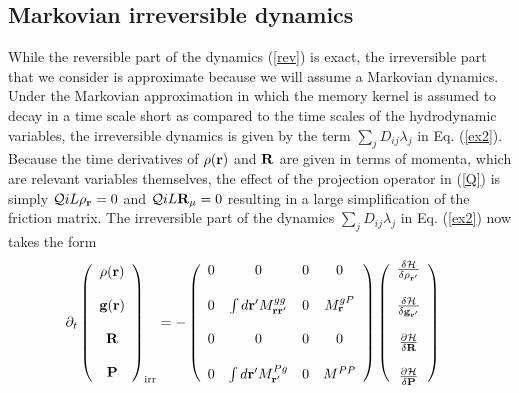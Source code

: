 \documentclass[a4paper,openright,12pt]{book}
\begin{document}
\subsection{Markovian irreversible dynamics}
While the  reversible part of  the dynamics (\ref{rev}) is  exact, the
irreversible  part  that we  consider  is  approximate
because  we will  assume a  Markovian dynamics.   Under the  Markovian
approximation in which the memory kernel is assumed to decay in a time
scale  short  as compared  to  the  time  scales of  the  hydrodynamic
variables,   the  irreversible   dynamics   is  given   by  the   term
$\sum_jD_{ij}\lambda_j$   in  Eq.   (\ref{ex2}).   Because   the  time
derivatives of  $\rho({\bf r})$ and  ${\bf R}$  are given in  terms of
momenta, which  are relevant variables  themselves, the effect  of the
projection operator in (\ref{Q}) is simply ${\cal Q} iL\rho_{\bf r}=0$
and ${\cal Q}  iL{\bf R}_{\mu}=0$ resulting in  a large simplification
of  the  friction  matrix.   The irreversible  part  of  the  dynamics
$\sum_jD_{ij}\lambda_j$ in Eq. (\ref{ex2}) now takes the form
\begin{align}
\partial_t  \left(
    \begin{array}{c}
\rho({\bf r})\\
\\
{\bf g}({\bf r})\\
\\
{\bf R}\\
\\
{\bf P}
    \end{array}
\right)_{\rm irr}
&=
-\left(\begin{array}{cccc}
  0&0 &0&0\\
\\
0 &\int d{\bf r}'M^{gg}_{{\bf r}{\bf r}'}&0&M^{gP}_{\bf r}\\
\\
  0&0 &0&0\\
\\
0&\int d{\bf r}' M^{Pg}_{{\bf r}'}&0&M^{PP}
\end{array}\right)
\left(    \begin{array}{c}
\frac{\delta {\cal H}}{\delta \rho_{{\bf r}'}}\\
\\
\frac{\delta {\cal H}}{\delta {\bf g}_{{\bf r}'}}\\
\\
\frac{\partial {\cal H}}{\delta {\bf R}}\\
\\
\frac{\partial {\cal H}}{\delta {\bf P}}
    \end{array}
\right)
\label{irr1}
\end{align}
\end{document}
